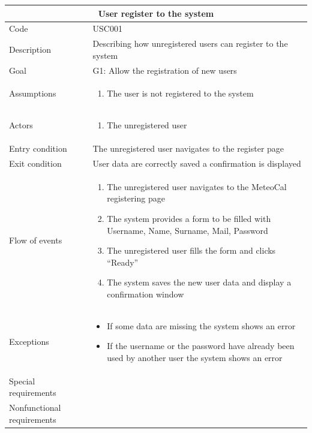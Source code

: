 \documentclass[10pt,a4paper,titlepage]{article}
\begin{document}
\begin{tabular}[h]{| p{3cm} | p{10cm} |}
\hline \multicolumn{2}{|c|}{\textbf{User register to the system}} \\ 
\hline Code & USC001 \\ 
\hline Description & Describing how unregistered users can register to the system\\
\hline Goal & G1: Allow the registration of new users \\
\hline Assumptions  & \begin{enumerate}
\item The user is not registered to the system
\end{enumerate} \\
\hline Actors &  \begin{enumerate}
\item The unregistered user
\end{enumerate} \\
\hline Entry condition & The unregistered user navigates to the register page \\
\hline Exit condition & User data are correctly saved a confirmation is displayed\\
\hline Flow of events & \begin{enumerate}
\item The unregistered user navigates to the MeteoCal registering page
\item The system provides a form to be filled with Username, Name, Surname, Mail, Password
\item The unregistered user fills the form and clicks “Ready”
\item The system saves the new user data and display a confirmation window
\end{enumerate}\\
\hline Exceptions & \begin{itemize}
\item If some data are missing the system shows an error
\item If the username or the password have already been used by another user the system shows an error 
\end{itemize} \\
\hline Special requirements & \\
\hline Nonfunctional requirements & \\
\hline
\end{tabular}
\end{document}
